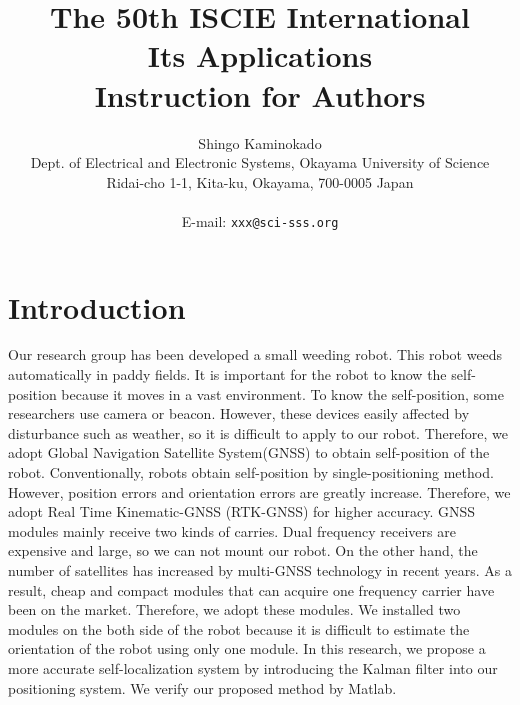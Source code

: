 \documentclass[a4paper]{article}
\begin{document}
\date{}
\title{\LARGE{\bf
The 50th ISCIE International \\
 Its Applications\\
Instruction for Authors}
}
\author{
Shingo Kaminokado \\
Dept. of Electrical and Electronic Systems, Okayama University of Science\\
Ridai-cho 1-1, Kita-ku, Okayama, 700-0005 Japan\\
\\E-mail: \texttt{xxx@sci-sss.org}
}

\maketitle
\thispagestyle{empty}


\section{Introduction}
Our research group has been developed a small weeding robot\cite{aigamo}. This robot weeds automatically in paddy fields.
It is important for the robot to know the self-position because it moves in a vast environment. To know the self-position, 
some researchers use camera\cite{camera-relate} or beacon\cite{beacon-relate}. 
However, these devices easily affected by disturbance such as weather, so it is difficult to apply to our robot.
Therefore, we adopt Global Navigation Satellite System(GNSS) to obtain self-position of the robot.
Conventionally, robots obtain self-position by single-positioning method.
However, position errors and orientation errors are greatly increase.
Therefore, we adopt Real Time Kinematic-GNSS (RTK-GNSS) for higher accuracy.
GNSS modules mainly receive two kinds of carries.
Dual frequency receivers are expensive and large, so we can not mount our robot.
On the other hand, the number of satellites has increased by multi-GNSS technology in recent years. As a result, cheap and compact modules that can acquire one frequency carrier have been on the market.
Therefore, we adopt these modules.
We installed two modules on the both side of the robot because it is difficult to estimate the orientation of the robot using only one module.
In this research, we propose a more accurate self-localization system by introducing the Kalman filter into our positioning system.
We verify our proposed method by Matlab.
\end{document}
